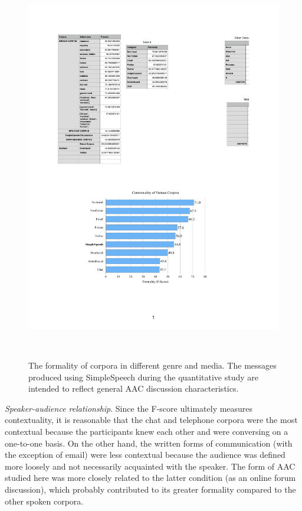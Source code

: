 \begin{figure}
	\centering
	\includegraphics[width=\columnwidth,keepaspectratio]{figures/formality_comparison}
	\caption{The formality of corpora in different genre and media. The messages produced using SimpleSpeech during the quantitative study are intended to reflect general AAC discussion characteristics.}~\label{fig:formality}
\end{figure}

\emph{Speaker-audience relationship}. 
Since the F-score ultimately measures contextuality, it is reasonable that the chat and telephone corpora were the most contextual because the participants knew each other and were conversing on a one-to-one basis. 
On the other hand, the written forms of communication (with the exception of email) were less contextual because the audience was defined more loosely and not necessarily acquainted with the speaker.
The form of AAC studied here was more closely related to the latter condition (as an online forum discussion), which probably contributed to its greater formality compared to the other spoken corpora.

